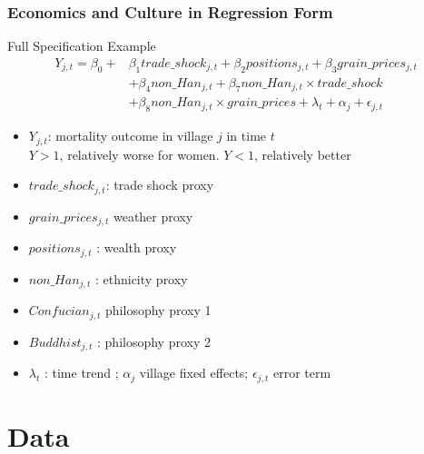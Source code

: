 \begin{comment}
\end{itemize}
\onslide<4->{Testing requires both levels and interactions}
\end{frame}

\end{comment}



\begin{frame}
\frametitle{Economics and Culture in Regression Form}
\begin{block}{Full Specification Example}
\begin{equation}
\begin{split}
Y_{j,t} = \beta_0 + & \beta_1 trade\_shock_{j,t} + \beta_2 positions_{j,t} + \beta_3 grain\_prices_{j,t} 
\\ & + \beta_4 non\_Han_{j,t} + \beta_7 non\_Han_{j,t} \times trade\_shock
\\ & + \beta_8 non\_Han_{j,t} \times grain\_prices + \lambda_t + \alpha_j + \epsilon_{j,t}
\end{split}
\end{equation} 
\end{block}
{\tiny
\begin{itemize}
\item $Y_{j,t}$: mortality outcome in village $j$ in time $t$\\
{\tiny $Y>1$, relatively worse for women. $Y<1$, relatively better}
\item $trade\_shock_{j,t} $: trade shock proxy
\item $grain\_prices_{j,t}$ weather proxy
\item $positions_{j,t}$ : wealth proxy
\item $non\_Han_{j,t}$ : ethnicity proxy
\item $Confucian_{j,t}$ philosophy proxy 1
\item $Buddhist_{j,t}$ : philosophy proxy 2
\item $\lambda_t$ : time trend ; $\alpha_j$ village fixed effects; $\epsilon_{j,t}$ error term 
\end{itemize}}

\end{frame}

\section{Data}


